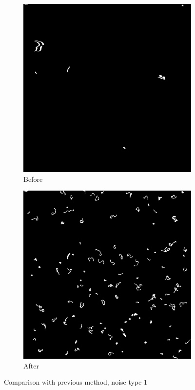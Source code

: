 \documentclass{article}
\begin{document}
\begin{figure}[!htbp]
	\begin{subfigure}{0.5\textwidth}
		\includegraphics[width=\linewidth]{before.png}
		\caption{Before}
		\label{fig:bwbefore}
	\end{subfigure}%
	\hspace{\fill}
	\begin{subfigure}{0.5\textwidth}
		\includegraphics[width=\linewidth]{after.png}
		\caption{After}
		\label{fig:bwafter}
	\end{subfigure}%
	\caption{Comparison with previous method, noise type 1}\label{fig:compareThresh}
\end{figure}
\end{document}

